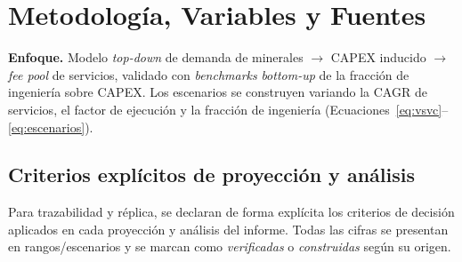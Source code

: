 \documentclass[11pt,letterpaper]{report}
\begin{document}
\appendix
\chapter{Metodología, Variables y Fuentes}
\label{ap:metodo}
\textbf{Enfoque.} Modelo \emph{top-down} de demanda de minerales $\rightarrow$ CAPEX inducido $\rightarrow$ \emph{fee pool} de
servicios, validado con \emph{benchmarks} \emph{bottom-up} de la fracción de ingeniería sobre CAPEX. Los escenarios se construyen
variando la CAGR de servicios, el factor de ejecución y la fracción de ingeniería (Ecuaciones~\ref{eq:vsvc}--\ref{eq:escenarios}).

\section{Criterios explícitos de proyección y análisis}
\label{sec:criterios}
Para trazabilidad y réplica, se declaran de forma explícita los criterios de decisión aplicados en cada proyección y análisis del
informe. Todas las cifras se presentan en rangos/escenarios y se marcan como \emph{verificadas} o \emph{construidas} según su origen.
\end{document}

